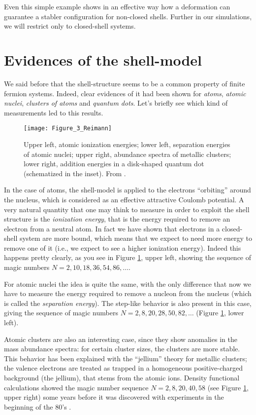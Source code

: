 Even this simple example shows in an effective way how a deformation can guarantee a stabler configuration for non-closed shells. Further in our simulations, we will restrict only to closed-shell systems.

\section{Evidences of the shell-model}
\label{sec:shell_model_evidences}
We said before that the shell-structure seems to be a common property of finite fermion systems. Indeed, clear evidences of it had been shown for \emph{atoms}, \emph{atomic nuclei}, \emph{clusters of atoms} and \emph{quantum dots}. Let's briefly see which kind of measurements led to this results.

\begin{figure}[h]%
	\centering
    \texttt{[image: Figure\_3\_Reimann]}
    \caption{Upper left, atomic ionization energies; lower left, separation energies of atomic nuclei; upper right, abundance spectra of metallic clusters; lower right, addition energies in a
disk-shaped quantum dot (schematized in the inset). From \cite{Reimann2002}.}
	\label{fig:Figure_3_Reimann}
\end{figure}

In the case of atoms, the shell-model is applied to the electrons ``orbiting'' around the nucleus, which is considered as an effective attractive Coulomb potential. A very natural quantity that one may think to measure in order to exploit the shell structure is the \emph{ionization energy}, that is the energy required to remove an electron from a neutral atom. In fact we have shown that electrons in a closed-shell system are more bound, which means that we expect to need more energy to remove one of it (i.e., we expect to see a higher ionization energy). Indeed this happens pretty clearly, as you see in Figure \ref{fig:Figure_3_Reimann}, upper left, showing the sequence of magic numbers $N=2,10,18,36,54,86,\ldots$.

For atomic nuclei the idea is quite the same, with the only difference that now we have to measure the energy required to remove a nucleon from the nucleus (which is called the \emph{separation energy}). The step-like behavior is also present in this case, giving the sequence of magic numbers $N=2,8,20,28,50,82,\ldots$ (Figure \ref{fig:Figure_3_Reimann}, lower left).

Atomic clusters are also an interesting case, since they show anomalies in the mass abundance spectra: for certain cluster sizes, the clusters are more stable. This behavior has been explained with the ``jellium'' theory for metallic clusters; the valence electrons are treated as trapped in a homogeneous positive-charged background (the jellium), that stems from the atomic ions. Density functional calculations showed the magic number sequence $N=2,8,20,40,58$ (see Figure \ref{fig:Figure_3_Reimann}, upper right) some years before it was discovered with experiments in the beginning of the 80's \citep[see][]{Reimann2002}.

